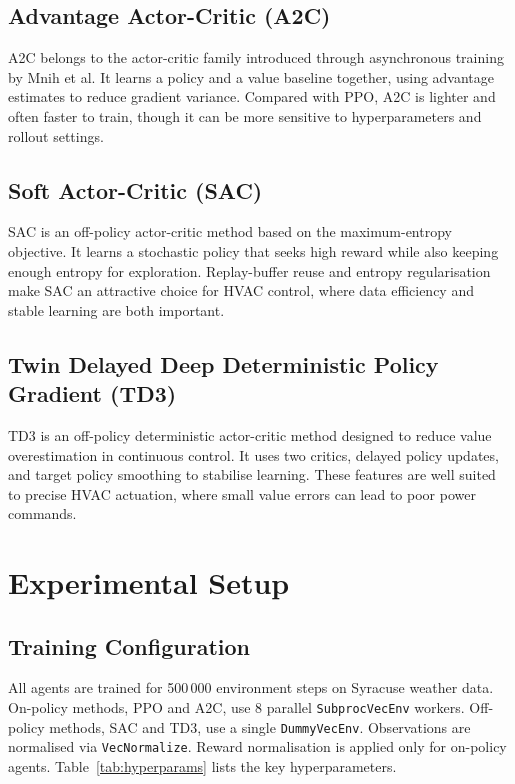 \documentclass[conference]{IEEEtran}
\begin{document}
\subsection{Advantage Actor-Critic (A2C)}
\label{subsec:a2c}
A2C belongs to the actor-critic family introduced through asynchronous
training by Mnih et al. It learns a policy and a value baseline together,
using advantage estimates to reduce gradient variance. Compared with PPO,
A2C is lighter and often faster to train, though it can be more sensitive to
hyperparameters and rollout settings.

\subsection{Soft Actor-Critic (SAC)}
\label{subsec:sac}
SAC is an off-policy actor-critic method based on the maximum-entropy
objective. It learns a stochastic policy that seeks high reward while also
keeping enough entropy for exploration. Replay-buffer reuse and entropy
regularisation make SAC an attractive choice for HVAC control, where data
efficiency and stable learning are both important.

\subsection{Twin Delayed Deep Deterministic Policy Gradient (TD3)}
\label{subsec:td3}
TD3 is an off-policy deterministic actor-critic method designed to reduce
value overestimation in continuous control. It uses two critics, delayed
policy updates, and target policy smoothing to stabilise learning. These
features are well suited to precise HVAC actuation, where small value errors
can lead to poor power commands.

\section{Experimental Setup}
\label{sec:experimental-setup}

\subsection{Training Configuration}
\label{subsec:training-config}
All agents are trained for 500\,000 environment steps on Syracuse
weather data. On-policy methods, PPO and A2C, use 8 parallel
\texttt{SubprocVecEnv} workers. Off-policy methods, SAC and TD3, use a
single \texttt{DummyVecEnv}. Observations are normalised via
\texttt{VecNormalize}. Reward normalisation is applied only for on-policy
agents. Table~\ref{tab:hyperparams} lists the key hyperparameters.
\end{document}

